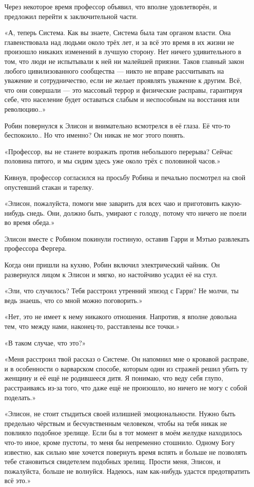 \documentclass[a5paper, 9pt,
final, openany, twoside=true]{memoir}
\begin{document}
Через некоторое время профессор объявил, что вполне удовлетворён, и предложил перейти к заключительной части.

«А, теперь Система. Как вы знаете, Система была там органом власти. Она главенствовала над людьми около трёх лет, и за всё это время в их жизни не произошло никаких изменений в лучшую сторону. Нет ничего удивительного в том, что люди не испытывали к ней ни малейшей приязни. Таков главный закон любого цивилизованного сообщества — никто не вправе рассчитывать на уважение и сотрудничество, если не желает проявлять уважение к другим. Всё, что они совершали — это массовый террор и физические расправы, гарантируя себе, что население будет оставаться слабым и неспособным на восстания или революцию..»\bigskip

Робин повернулся к Элисон и внимательно всмотрелся в её глаза. Её что-то беспокоило.. Но что именно? Он никак не мог этого понять.

«Профессор, вы не станете возражать против небольшого перерыва? Сейчас половина пятого, и мы сидим здесь уже около трёх с половиной часов.»

Кивнув, профессор согласился на просьбу Робина и печально посмотрел на свой опустевший стакан и тарелку.

«Элисон, пожалуйста, помоги мне заварить для всех чаю и приготовить какую-нибудь снедь. Они, должно быть, умирают с голоду, потому что ничего не поели во время обеда.»

Элисон вместе с Робином покинули гостиную, оставив Гарри и Мэтью развлекать профессора Фергера.

Когда они пришли на кухню, Робин включил электрический чайник. Он развернулся лицом к Элисон и мягко, но настойчиво усадил её на стул.

«Эли, что случилось? Тебя расстроил утренний эпизод с Гарри? Не молчи, ты ведь знаешь, что со мной можно поговорить.»

«Нет, это не имеет к нему никакого отношения. Напротив, я вполне довольна тем, что между нами, наконец-то, расставлены все точки.»

«В таком случае, что это?»

«Меня расстроил твой рассказ о Системе. Он напомнил мне о кровавой расправе, и в особенности о варварском способе, которым один из стражей решил убить ту женщину и её ещё не родившееся дитя. Я понимаю, что веду себя глупо, расстраиваясь из-за того, что даже ещё не произошло, но ничего не могу с собой поделать.»

«Элисон, не стоит стыдиться своей излишней эмоциональности. Нужно быть предельно чёрствым и бесчувственным человеком, чтобы на тебя никак не повлияло подобное зрелище. Если бы в тот момент в моём желудке находилось что-то иное, кроме пустоты, то меня бы непременно стошнило. Одному Богу известно, как сильно мне хочется повернуть время вспять и больше не позволять тебе становиться свидетелем подобных зрелищ. Прости меня, Элисон, и пожалуйста, больше не волнуйся. Надеюсь, нам как-нибудь удастся предотвратить всё это.»
\end{document}

